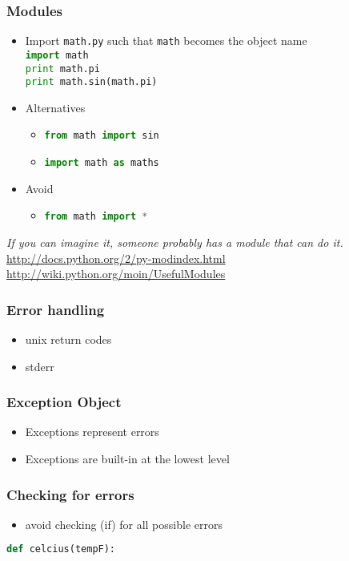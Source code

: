 \documentclass[xcolor=table,10pt,final]{beamer}
\begin{document}
\begin{frame}
  \frametitle{Modules}
  \begin{itemize}
    \item Import {\tt math.py} such that {\tt math} becomes the object name\\
      \lstinline[language=Python]|import math|\\
      \lstinline[language=Python]|print math.pi|\\
      \lstinline[language=Python]|print math.sin(math.pi)|
    \item Alternatives
      \begin{itemize}
        \item \lstinline[language=Python]|from math import sin|
        \item \lstinline[language=Python]|import math as maths|
      \end{itemize}
    \item Avoid
      \begin{itemize}
        \item \lstinline[language=Python]|from math import *|
      \end{itemize}
  \end{itemize}
  \vskip1cm
{\it If you can imagine it, someone probably has a module that can do it.}\\
{\scriptsize \url{http://docs.python.org/2/py-modindex.html}}\\
{\scriptsize \url{http://wiki.python.org/moin/UsefulModules}}\\
\end{frame}

\begin{frame}
  \frametitle{Error handling}
  \begin{itemize}
    \item unix return codes
    \item stderr
  \end{itemize}
\end{frame}

\begin{frame}
  \frametitle{Exception Object}
  \begin{itemize}
    \item Exceptions represent errors
    \item Exceptions are built-in at the lowest level
  \end{itemize}
\end{frame}

\begin{frame}[fragile]
  \frametitle{Checking for errors}
  \begin{itemize}
    \item avoid checking (if) for all possible errors
  \end{itemize}
  \begin{lstlisting}[language=Python]
def celcius(tempF):
\end{lstlisting}
\end{frame}
\end{document}
